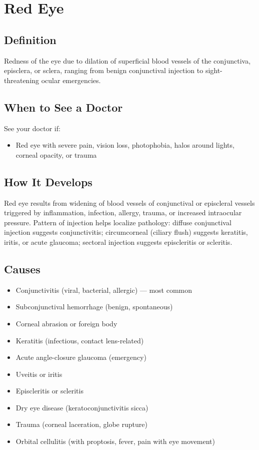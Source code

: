 \chapter{Red Eye}

\section*{Definition}
Redness of the eye due to dilation of superficial blood vessels of the conjunctiva, episclera, or sclera, ranging from benign conjunctival injection to sight-threatening ocular emergencies.

\section*{When to See a Doctor}
See your doctor if:
\begin{itemize}
  \item Red eye with severe pain, vision loss, photophobia, halos around lights, corneal opacity, or trauma
\end{itemize}

\section*{How It Develops}
Red eye results from widening of blood vessels of conjunctival or episcleral vessels triggered by inflammation, infection, allergy, trauma, or increased intraocular pressure. Pattern of injection helps localize pathology: diffuse conjunctival injection suggests conjunctivitis; circumcorneal (ciliary flush) suggests keratitis, iritis, or acute glaucoma; sectoral injection suggests episcleritis or scleritis.

\section*{Causes}
\begin{itemize}
  \item Conjunctivitis (viral, bacterial, allergic) — most common
  \item Subconjunctival hemorrhage (benign, spontaneous)
  \item Corneal abrasion or foreign body
  \item Keratitis (infectious, contact lens-related)
  \item Acute angle-closure glaucoma (emergency)
  \item Uveitis or iritis
  \item Episcleritis or scleritis
  \item Dry eye disease (keratoconjunctivitis sicca)
  \item Trauma (corneal laceration, globe rupture)
  \item Orbital cellulitis (with proptosis, fever, pain with eye movement)
\end{itemize}

